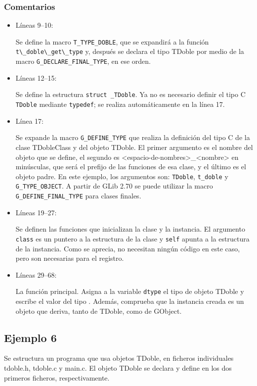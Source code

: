 \subsubsection{Comentarios}
\begin{itemize}
\item Líneas 9--10:\par
  Se define la macro \texttt{T\_TYPE\_DOBLE}, que se expandirá a la función
  \passthrough{\lstinline!t\_doble\_get\_type!} y, después se declara el tipo \textsf{TDoble} por medio
  de la macro \texttt{G\_DECLARE\_FINAL\_TYPE}, en ese orden.
\item Líneas 12--15:\par
  Se define la estructura \texttt{struct \_TDoble}. Ya no es necesario definir el tipo C \texttt{TDoble} mediante
  \texttt{typedef}; se realiza automáticamente en la línea 17.
\item Línea 17:\par
  Se expande la macro \texttt{G\_DEFINE\_TYPE} que realiza la definición del tipo C de la clase
  \textsf{TDobleClass} y del objeto \textsf{TDoble}.
  El primer argumento es el nombre del objeto que se define,   el segundo es \textsf{<espacio-de-nombres>\_<nombre>} en minúsculas, que será el prefijo de las funciones de esa clase,
  y el último es el objeto padre.
  En este ejemplo, los argumentos son: \texttt{TDoble}, \texttt{t\_doble} y \texttt{G\_TYPE\_OBJECT}.
  A partir de \textsf{GLib 2.70} se puede utilizar la macro \texttt{G\_DEFINE\_FINAL\_TYPE} para clases finales.
\item Líneas 19--27:\par
  Se definen las funciones que inicializan la clase y la instancia. El argumento \texttt{class} es un puntero a la
  estructura de la clase y \texttt{self} apunta a la estructura de la instancia. Como se aprecia, no
  necesitan ningún código en este caso, pero son necesarias para el registro.
\item Líneas 29--68:\par
  La función principal. Asigna a la variable \texttt{dtype} el tipo de objeto \textsf{TDoble} y escribe el valor
  del tipo . Además, comprueba que la instancia creada es un objeto que deriva, tanto de
  \textsf{TDoble}, como de \textsf{GObject}.
\end{itemize}

\subsection{Ejemplo 6}
Se estructura un programa que usa objetos \textsf{TDoble}, en ficheros individuales \textsf{tdoble.h},
\textsf{tdoble.c} y \textsf{main.c}.
El objeto \textsf{TDoble} se declara y define en los dos primeros ficheros, respectivamente.

